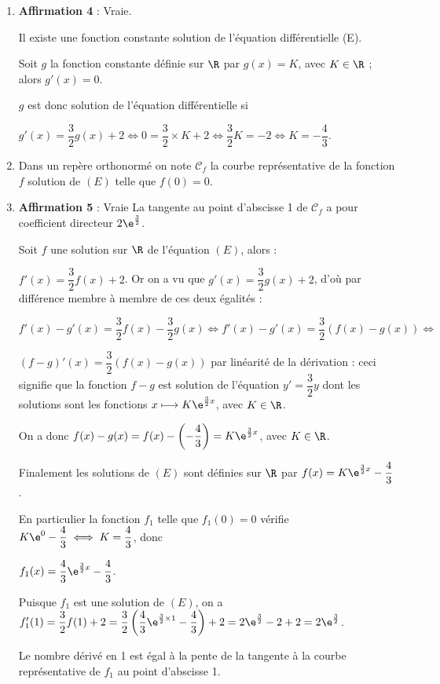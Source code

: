 \begin{enumerate}
\item \textbf{Affirmation 4} : Vraie.  

Il existe une fonction constante solution de l'équation différentielle (E).

Soit $g$ la fonction constante définie sur $\R$ par $g(x) = K$, avec $K \in \R$ ; alors $g'(x) = 0$.

$g$ est donc solution de l'équation différentielle si 

$g'(x) = \dfrac32g(x) + 2 \iff 0 = \dfrac32 \times K + 2 \iff \dfrac32K = - 2 \iff K= - \dfrac43$.
\item Dans un repère orthonormé \Oij{} on note $\mathcal{C}_f$ la courbe représentative de la fonction $f$ solution de $(E)$ telle  que $f(0) = 0$.

\item \textbf{Affirmation 5} : Vraie  La tangente au point d'abscisse 1 de $\mathcal{C}_f$ a pour coefficient directeur $2 \e^{\frac32}$.

Soit $f$ une  solution sur $\R$ de l'équation $(E)$, alors :

$f'(x) = \dfrac32 f(x) + 2$. Or on a vu que $g'(x) =\dfrac32 g(x) + 2$, d'où par différence membre à membre de ces deux égalités :

$f'(x) - g'(x) = \dfrac32 f(x) - \dfrac32 g(x) \iff f'(x) - g'(x) = \dfrac32 (f(x) - g(x)) \iff $

$(f - g)'(x) = \dfrac32 (f(x) - g(x))$ par linéarité de la dérivation : ceci signifie que la fonction $f - g$ est solution de l'équation $y' = \dfrac32y$ dont les solutions sont les fonctions $x \longmapsto K\e^{\frac32 x}$, avec $ K \in \R$.

On a donc $f(x) - g(x) = f(x ) - \left(- \dfrac43\right) = K\e^{\frac32 x}$, avec $ K \in \R$.

Finalement les solutions de $(E)$ sont définies sur $\R$ par $f(x) = K\e^{\frac32 x} - \dfrac43$.

En particulier la fonction $f_1$ telle que $f_1(0) = 0$ vérifie $K\e^{0} - \dfrac43 \iff K = \dfrac43$, donc 

$f_1(x) = \dfrac43\e^{\frac32 x} - \dfrac43$.

Puisque $f_1$ est une solution de $(E)$, on a $f'_1(1) = \dfrac32f(1) + 2 = \dfrac32\left(\dfrac43\e^{\frac32\times 1} - \dfrac43\right) + 2 = 2\e^{\frac32} - 2 + 2 = 2\e^{\frac32}$. 

Le nombre dérivé en 1 est égal à la pente de la tangente à la courbe représentative de $f_1$ au point d'abscisse 1.
\end{enumerate}

\bigskip
